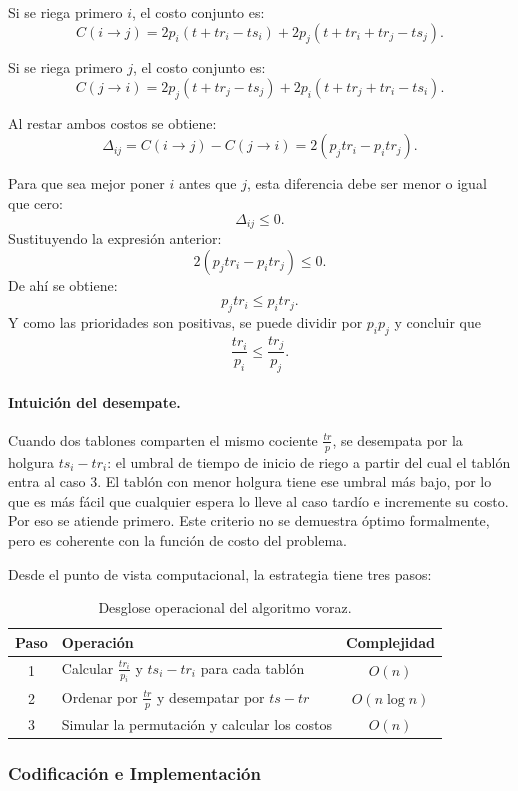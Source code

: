 \documentclass[12pt,a4paper]{article}
\begin{document}
Si se riega primero \(i\), el costo conjunto es:
\[
C(i\rightarrow j)=2p_i(t+tr_i-ts_i)+2p_j(t+tr_i+tr_j-ts_j).
\]

Si se riega primero \(j\), el costo conjunto es:
\[
C(j\rightarrow i)=2p_j(t+tr_j-ts_j)+2p_i(t+tr_j+tr_i-ts_i).
\]

Al restar ambos costos se obtiene:
\[
\Delta_{ij}=C(i\rightarrow j)-C(j\rightarrow i)=2(p_jtr_i-p_itr_j).
\]

Para que sea mejor poner \(i\) antes que \(j\), esta diferencia debe ser menor o igual que cero:
\[
\Delta_{ij}\le 0.
\]
Sustituyendo la expresi\'on anterior:
\[
2(p_jtr_i-p_itr_j)\le 0.
\]
De ah\'i se obtiene:
\[
p_jtr_i\le p_itr_j.
\]
Y como las prioridades son positivas, se puede dividir por \(p_ip_j\) y concluir que
\[
\frac{tr_i}{p_i}\leq \frac{tr_j}{p_j}.
\]

\paragraph{Intuici\'on del desempate.}
Cuando dos tablones comparten el mismo cociente $\frac{tr}{p}$, se desempata por la 
holgura $ts_i - tr_i$: el umbral de tiempo de inicio de riego a partir del cual 
el tabl\'on entra al caso 3. El tabl\'on con menor holgura tiene ese umbral m\'as 
bajo, por lo que es m\'as f\'acil que cualquier espera lo lleve al caso tard\'io 
e incremente su costo. Por eso se atiende primero. Este criterio no se demuestra 
\'optimo formalmente, pero es coherente con la funci\'on de costo del problema.

Desde el punto de vista computacional, la estrategia tiene tres pasos:

\begin{table}[H]
  \centering
  \begin{tabular}{clc}
    \toprule
    Paso & Operaci\'on & Complejidad \\
    \midrule
    1 & Calcular \(\frac{tr_i}{p_i}\) y \(ts_i-tr_i\) para cada tabl\'on & \(O(n)\) \\
    2 & Ordenar por \(\frac{tr}{p}\) y desempatar por \(ts-tr\) & \(O(n\log n)\) \\
    3 & Simular la permutaci\'on y calcular los costos & \(O(n)\) \\
    \bottomrule
  \end{tabular}
  \caption{Desglose operacional del algoritmo voraz.}
\end{table}

\subsubsection{Codificaci\'on e Implementaci\'on}
\end{document}
